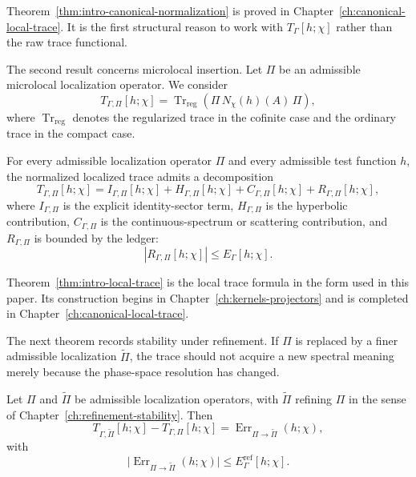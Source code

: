 Theorem~\ref{thm:intro-canonical-normalization} is proved in Chapter~\ref{ch:canonical-local-trace}.  It is the first structural reason to work with \(T_\Gamma[h;\chi]\) rather than the raw trace functional.

The second result concerns microlocal insertion.  Let \(\Pi\) be an admissible microlocal localization operator.  We consider
\begin{equation}
  T_{\Gamma,\Pi}[h;\chi]
  =
  \operatorname{Tr}_{\mathrm{reg}}
  \left(
    \Pi\,N_\chi(h)(A)\,\Pi
  \right),
  \label{eq:intro-localized-trace}
\end{equation}
where \(\operatorname{Tr}_{\mathrm{reg}}\) denotes the regularized trace in the cofinite case and the ordinary trace in the compact case.

\begin{theorem}
\label{thm:intro-local-trace}
For every admissible localization operator \(\Pi\) and every admissible test function \(h\), the normalized localized trace admits a decomposition
\begin{equation}
  T_{\Gamma,\Pi}[h;\chi]
  =
  I_{\Gamma,\Pi}[h;\chi]
  +
  H_{\Gamma,\Pi}[h;\chi]
  +
  C_{\Gamma,\Pi}[h;\chi]
  +
  R_{\Gamma,\Pi}[h;\chi],
  \label{eq:intro-local-trace-decomposition}
\end{equation}
where \(I_{\Gamma,\Pi}\) is the explicit identity-sector term, \(H_{\Gamma,\Pi}\) is the hyperbolic contribution, \(C_{\Gamma,\Pi}\) is the continuous-spectrum or scattering contribution, and \(R_{\Gamma,\Pi}\) is bounded by the ledger:
\begin{equation}
  |R_{\Gamma,\Pi}[h;\chi]|
  \le
  E_\Gamma[h;\chi].
  \label{eq:intro-local-trace-ledger-bound}
\end{equation}
\end{theorem}

Theorem~\ref{thm:intro-local-trace} is the local trace formula in the form used in this paper.  Its construction begins in Chapter~\ref{ch:kernels-projectors} and is completed in Chapter~\ref{ch:canonical-local-trace}.

The next theorem records stability under refinement.  If \(\Pi\) is replaced by a finer admissible localization \(\widetilde\Pi\), the trace should not acquire a new spectral meaning merely because the phase-space resolution has changed.

\begin{theorem}
\label{thm:intro-refinement-stability}
Let \(\Pi\) and \(\widetilde\Pi\) be admissible localization operators, with \(\widetilde\Pi\) refining \(\Pi\) in the sense of Chapter~\ref{ch:refinement-stability}.  Then
\begin{equation}
  T_{\Gamma,\widetilde\Pi}[h;\chi]
  -
  T_{\Gamma,\Pi}[h;\chi]
  =
  \operatorname{Err}_{\Pi\to\widetilde\Pi}(h;\chi),
  \label{eq:intro-refinement-difference}
\end{equation}
with
\begin{equation}
  \big|
  \operatorname{Err}_{\Pi\to\widetilde\Pi}(h;\chi)
  \big|
  \le
  E_\Gamma^{\mathrm{ref}}[h;\chi].
  \label{eq:intro-refinement-bound}
\end{equation}
\end{theorem}


